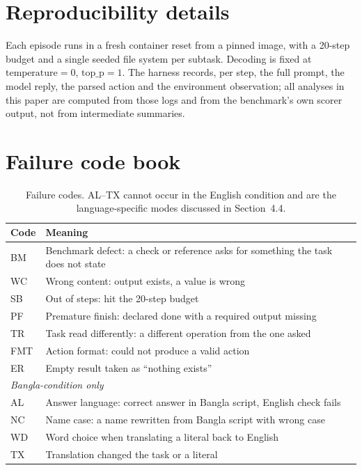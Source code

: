 \documentclass[11pt]{article}
\begin{document}


\appendix

\section{Reproducibility details}
\label{app:repro}

Each episode runs in a fresh container reset from a pinned image, with a 20-step budget and a
single seeded file system per subtask. Decoding is fixed at $\mathrm{temperature}=0$,
$\mathrm{top\_p}=1$. The harness records, per step, the full prompt, the model reply, the parsed
action and the environment observation; all analyses in this paper are computed from those logs
and from the benchmark's own scorer output, not from intermediate summaries.

\section{Failure code book}
\label{app:codes}

\begin{table}[h]
\centering\small
\begin{tabular}{lp{5.1cm}}
\toprule
Code & Meaning \\
\midrule
BM  & Benchmark defect: a check or reference asks for something the task does not state \\
WC  & Wrong content: output exists, a value is wrong \\
SB  & Out of steps: hit the 20-step budget \\
PF  & Premature finish: declared done with a required output missing \\
TR  & Task read differently: a different operation from the one asked \\
FMT & Action format: could not produce a valid action \\
ER  & Empty result taken as ``nothing exists'' \\
\midrule
\multicolumn{2}{l}{\emph{Bangla-condition only}} \\
AL  & Answer language: correct answer in Bangla script, English check fails \\
NC  & Name case: a name rewritten from Bangla script with wrong case \\
WD  & Word choice when translating a literal back to English \\
TX  & Translation changed the task or a literal \\
\bottomrule
\end{tabular}
\caption{Failure codes. AL--TX cannot occur in the English condition and are the
language-specific modes discussed in Section~4.4.}
\label{tab:codebook}
\end{table}
\end{document}
